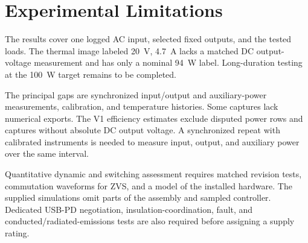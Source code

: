 \section{Experimental Limitations}
\label{sec:disc-limitations}

The results cover one logged AC input, selected fixed outputs, and the
tested loads. The thermal image labeled \SI{20}{\volt},
\SI{4.7}{\ampere} lacks a matched DC output-voltage measurement and
has only a nominal \SI{94}{\watt} label. Long-duration testing at the
\SI{100}{\watt} target remains to be completed.

The principal gaps are synchronized input/output and auxiliary-power
measurements, calibration, and temperature histories. Some captures lack
numerical exports. The V1 efficiency estimates exclude disputed power rows and
captures without absolute DC output voltage. A synchronized repeat with
calibrated instruments is needed to measure input, output, and auxiliary
power over the same interval.

Quantitative dynamic and switching assessment requires matched revision
tests, commutation waveforms for ZVS, and a model of the installed
hardware. The supplied simulations omit parts of the assembly and sampled
controller. Dedicated USB-PD negotiation, insulation-coordination, fault,
and conducted/radiated-emissions tests are also required before assigning
a supply rating.

